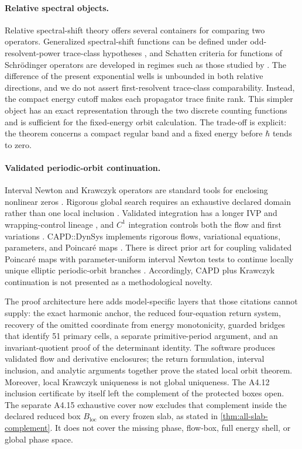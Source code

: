\paragraph{Relative spectral objects.}
Relative spectral-shift theory offers several containers for comparing two
operators.  Generalized spectral-shift functions can be defined under
odd-resolvent-power trace-class hypotheses \citep{Yafaev2005}, and Schatten
criteria for functions of Schr\"odinger operators are developed in regimes
such as those studied by \citet{FrankPushnitski2019}.  The difference of the
present exponential wells is unbounded in both relative directions, and we
do not assert first-resolvent trace-class comparability.  Instead, the
compact energy cutoff makes each propagator trace finite rank.  This simpler
object has an exact representation through the two discrete counting
functions and is sufficient for the fixed-energy orbit calculation.  The
trade-off is explicit: the theorem concerns a compact regular band and a
fixed energy before \(\hbar\) tends to zero.

\paragraph{Validated periodic-orbit continuation.}
Interval Newton and Krawczyk operators are standard tools for enclosing
nonlinear zeros
\citep{Krawczyk1969,Neumaier1990,MooreKearfottCloud2009,Rump2010}.  Rigorous
global search requires an exhaustive declared domain rather than one local
inclusion \citep{Kearfott1996}.  Validated integration has a longer IVP and
wrapping-control lineage \citep{Lohner1987,NedialkovJacksonCorliss1999}, and
\(C^1\) integration controls both the flow and first variations
\citep{Zgliczynski2002}.  CAPD::DynSys implements rigorous flows,
variational equations, parameters, and Poincar\'e maps
\citep{KapelaMrozekWilczakZgliczynski2021,KapelaWilczakZgliczynski2022}.
There is direct prior art for coupling validated Poincar\'e maps with
parameter-uniform interval Newton tests to continue locally unique elliptic
periodic-orbit branches
\citep{WilczakZgliczynski2009,BarrioRodriguez2014,WilczakBarrio2017}.
Accordingly, CAPD plus
Krawczyk continuation is not presented as a methodological novelty.

The proof architecture here adds model-specific layers that those citations
cannot supply: the exact harmonic anchor, the reduced four-equation return
system, recovery of the omitted coordinate from energy monotonicity, guarded
bridges that identify 51 primary cells, a separate primitive-period argument,
and an invariant-quotient proof of the determinant identity.  The software
produces validated flow and derivative enclosures; the return formulation,
interval inclusion, and analytic arguments together prove the stated local
orbit theorem.  Moreover, local Krawczyk uniqueness is not global
uniqueness.  The A4.12 inclusion certificate by itself left the complement
of the protected boxes open.  The separate A4.15 exhaustive cover now
excludes that complement inside the declared reduced box
\(B_{\mathrm{loc}}\) on every frozen slab, as stated in
\cref{thm:all-slab-complement}.  It does not cover the missing phase,
flow-box, full energy shell, or global phase space.

